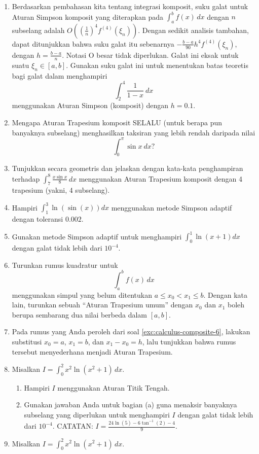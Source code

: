 \begin{enumerate}
\item Berdasarkan pembahasan kita tentang integrasi komposit, suku galat
untuk Aturan Simpson komposit yang diterapkan pada $\int_{a}^{b}f(x)\,dx$
dengan $n$ subselang adalah $O\left(\left(\frac{1}{n}\right)^{4}f^{(4)}(\xi_{n})\right)$.
Dengan sedikit analisis tambahan, dapat ditunjukkan bahwa suku galat
itu sebenarnya $-\frac{b-a}{90}h^{4}f^{(4)}(\xi_{n})$, dengan $h=\frac{b-a}{n}$.
Notasi O besar tidak diperlukan. Galat ini eksak untuk suatu $\xi_{n}\in[a,b]$.
Gunakan suku galat ini untuk menentukan batas teoretis bagi galat
dalam menghampiri 
\[
\int_{2}^{4}\frac{1}{1-x}\:dx
\]
menggunakan Aturan Simpson (komposit) dengan $h=0.1$.
\item Mengapa Aturan Trapesium komposit SELALU (untuk berapa pun banyaknya
subselang) menghasilkan taksiran yang lebih rendah daripada nilai
\[
\int_{0}^{\pi}\sin x\:dx?
\]
\item Tunjukkan secara geometris dan jelaskan dengan kata-kata penghampiran
terhadap $\int_{7}^{8}\frac{x\sin x}{8}\,dx$ menggunakan Aturan Trapesium
komposit dengan 4 trapesium (yakni, 4 subselang).
\item \label{exc:calculus-composite-17}Hampiri $\int_{1}^{3}\ln(\sin(x))dx$
menggunakan metode Simpson adaptif dengan toleransi $0.002$. \hasasolution 
\item \label{exc:calculus-composite-18}Gunakan metode Simpson adaptif untuk
menghampiri ${\displaystyle \int_{0}^{1}\ln(x+1)dx}$ dengan galat
tidak lebih dari $10^{-4}$. \hasananswer 
\item \label{exc:calculus-composite-6}Turunkan rumus kuadratur untuk 
\[
\int_{a}^{b}f(x)\,dx
\]
menggunakan simpul yang belum ditentukan $a\leq x_{0}<x_{1}\leq b$.
Dengan kata lain, turunkan sebuah ``Aturan Trapesium umum'' dengan
$x_{0}$ dan $x_{1}$ boleh berupa sembarang dua nilai berbeda dalam
$[a,b]$.
\item Pada rumus yang Anda peroleh dari soal \ref{exc:calculus-composite-6},
lakukan substitusi $x_{0}=a$, $x_{1}=b$, dan $x_{1}-x_{0}=h$, lalu
tunjukkan bahwa rumus tersebut menyederhana menjadi Aturan Trapesium.
\item \label{exc:calculus-composite-1}Misalkan $I=\int_{0}^{2}x^{2}\ln(x^{2}+1)\,dx$. \hasananswer 

\begin{enumerate}
\item Hampiri $I$ menggunakan Aturan Titik Tengah.
\item \label{est1}Gunakan jawaban Anda untuk bagian (a) guna menaksir banyaknya
subselang yang diperlukan untuk menghampiri $I$ dengan galat tidak
lebih dari $10^{-4}$. CATATAN: $I=\frac{24\ln(5)-6\tan^{-1}(2)-4}{9}$.
\end{enumerate}
\item \label{exc:calculus-composite-2}Misalkan $I=\int_{0}^{2}x^{2}\ln(x^{2}+1)\,dx$.


\end{enumerate}

